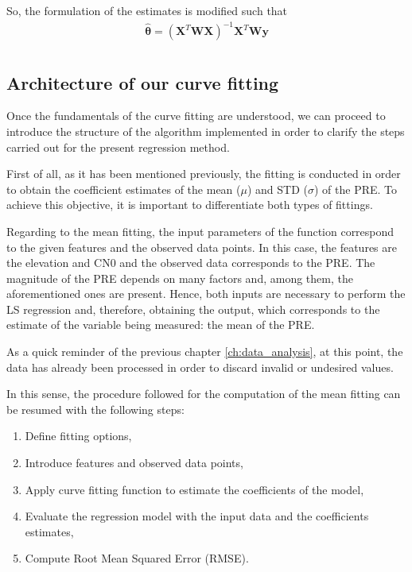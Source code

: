 \documentclass[a4paper, report, oneside, UKenglish]{memoir}
\newcommand{\by}{\boldsymbol{y}}
\newcommand{\btheta}{\boldsymbol{\theta}}
\begin{document}
So, the formulation of the estimates is modified such that
\begin{equation}\label{eq:estimatorWLS}
\begin{split}
    \hat{\btheta} = (\textbf{X}^{T}\textbf{W}\textbf{X})^{-1}\textbf{X}^{T}\textbf{W}\by\\
\end{split}
\end{equation}

\subsection{Architecture of our curve fitting}

Once the fundamentals of the curve fitting are understood, we can proceed to introduce the structure of the algorithm implemented in order to clarify the steps carried out for the present regression method.

First of all, as it has been mentioned previously, the fitting is conducted in order to obtain the coefficient estimates of the mean ($\mu$) and STD ($\sigma$) of the PRE. To achieve this objective, it is important to differentiate both types of fittings. 

Regarding to the mean fitting, the input parameters of the function correspond to the given features and the observed data points. In this case, the features are the elevation and CN0 and the observed data corresponds to the PRE. The magnitude of the PRE depends on many factors and, among them, the aforementioned ones are present. Hence, both inputs are necessary to perform the LS regression and, therefore, obtaining the output, which corresponds to the estimate of the variable being measured: the mean of the PRE.  

As a quick reminder of the previous chapter \ref{ch:data_analysis}, at this point, the data has already been processed in order to discard invalid or undesired values. 

In this sense, the procedure followed for the computation of the mean fitting can be resumed with the following steps:
\begin{enumerate}
    \item Define fitting options,
    \item Introduce features and observed data points,  
    \item Apply curve fitting function to estimate the coefficients of the model,
    \item Evaluate the regression model with the input data and the coefficients estimates,
    \item Compute Root Mean Squared Error (RMSE). 
\end{enumerate}
\end{document}
